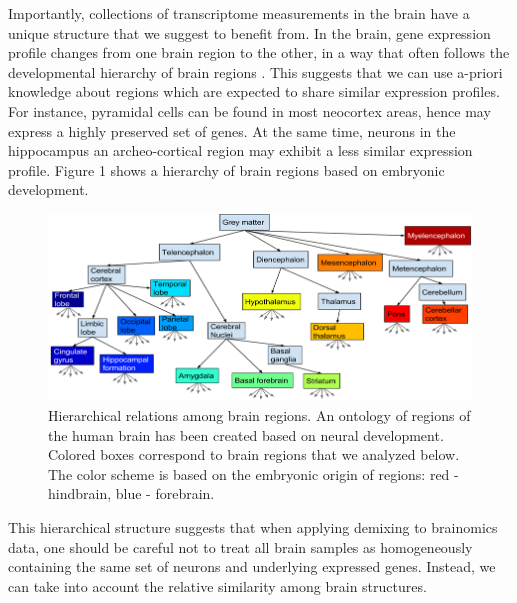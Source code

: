\documentclass{article} %
\begin{document}

Importantly, collections of transcriptome measurements in the brain have a unique structure that we suggest to benefit from. In the brain, gene expression profile changes from one brain region to the other, in a way that often follows the developmental hierarchy of brain regions \cite{zapala2005}. This suggests that we can use a-priori knowledge about regions which are expected to share similar expression profiles. For instance, pyramidal cells can be found in most neocortex areas, hence may express a highly preserved set of genes. At the same time, neurons in the hippocampus an archeo-cortical region may exhibit a less similar expression profile.  Figure 1 shows a hierarchy of brain regions based on embryonic development. 

\begin{figure}[!hbt]
  \begin{minipage}[c]{0.65\textwidth}
    \includegraphics[width=\textwidth]{tree}
  \end{minipage}\hfill
  \begin{minipage}[c]{0.3\textwidth}
    \caption{Hierarchical relations among brain regions. An ontology of regions of the human brain has been created based on neural development. Colored boxes correspond to brain regions that we analyzed below. The color scheme is based on the embryonic origin of regions: red - hindbrain, blue - forebrain.} 
    \label{fig:bro}
  \end{minipage}
\end{figure}

This hierarchical structure suggests that when applying demixing to brainomics data, one should be careful not to treat all brain samples as homogeneously containing the same set of neurons and underlying expressed genes. Instead, we can take into account the relative similarity among brain structures. 
\end{document}

